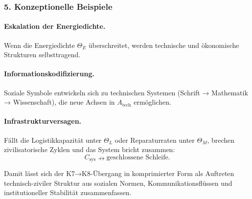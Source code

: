 \subsubsection{5. Konzeptionelle Beispiele}

\paragraph{Eskalation der Energiedichte.}
Wenn die Energiedichte $\Theta_E$ überschreitet, werden technische und
ökonomische Strukturen selbsttragend.

\paragraph{Informationskodifizierung.}
Soziale Symbole entwickeln sich zu technischen Systemen (Schrift → Mathematik →
Wissenschaft), die neue Achsen in $A_{\mathrm{tech}}$ ermöglichen.

\paragraph{Infrastrukturversagen.}
Fällt die Logistikkapazität unter $\Theta_L$ oder Reparaturraten unter
$\Theta_M$, brechen zivilisatorische Zyklen und das System bricht zusammen:
\[
C_{\mathrm{sys}} \nrightarrow \text{geschlossene Schleife}.
\]

Damit lässt sich der K7→K8-Übergang in komprimierter Form als Auftreten
technisch-ziviler Struktur aus sozialen Normen, Kommunikationsflüssen und
institutioneller Stabilität zusammenfassen.

